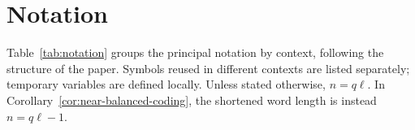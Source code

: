 \documentclass[11pt,a4paper]{article}
\numberwithin{equation}{section}
\numberwithin{figure}{section}
\numberwithin{table}{section}
\numberwithin{footnote}{section}
\theoremstyle{informal}\newtheorem*{informaltheorem}{Informal theorem}
\theoremstyle{definition}\newtheorem{example}{Example}[section]
\theoremstyle{remark}\newtheorem{remark}[theorem]{Remark}
\begin{document}
\appendix
\clearpage
{}
{}
\section{Notation}\label{app:notation}
Table~\ref{tab:notation} groups the principal notation by context,
following the structure of the paper. Symbols reused in different contexts are
listed separately; temporary variables are defined locally.
Unless stated otherwise, \(n=q\ell\). In
Corollary~\ref{cor:near-balanced-coding}, the shortened word length
is instead \(n=q\ell-1\).

\begingroup
\footnotesize
\renewcommand{\arraystretch}{1.00}
\setlength{\tabcolsep}{5pt}
\setlength{\LTpre}{6pt}
\end{document}
